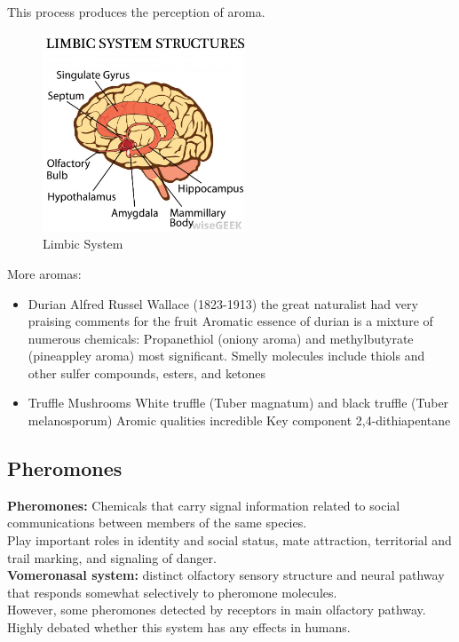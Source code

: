 \documentclass{article}
\begin{document}
This process produces the perception of aroma. \\

\begin{figure}[htp]
\centering
\includegraphics[width=6cm]{images/limbicsystem.jpg}
\caption{Limbic System}
\label{fig: Limbic System}
\end{figure}

More aromas: 
\begin{itemize}
    \item Durian
        \subitem Alfred Russel Wallace (1823-1913) the great naturalist had very praising comments for the fruit
        \subitem Aromatic essence of durian is a mixture of numerous chemicals: Propanethiol (oniony aroma) and methylbutyrate (pineappley aroma) most significant. 
        \subitem Smelly molecules include thiols and other sulfer compounds, esters, and ketones    
    \item Truffle Mushrooms
        \subitem White truffle (Tuber magnatum) and black truffle (Tuber melanosporum)
        \subitem Aromic qualities incredible
        \subitem Key component 2,4-dithiapentane
\end{itemize}

\subsection{Pheromones}

\textbf{Pheromones:} Chemicals that carry signal information related to social communications between members of the same species. \\
Play important roles in identity and social status, mate attraction, territorial and trail marking, and signaling of danger. \\

\noindent \textbf{Vomeronasal system:} distinct olfactory sensory structure and neural pathway that responds somewhat selectively to pheromone molecules. \\
However, some pheromones detected by receptors in main olfactory pathway. Highly debated whether this system has any effects in humans. \\
\end{document}
